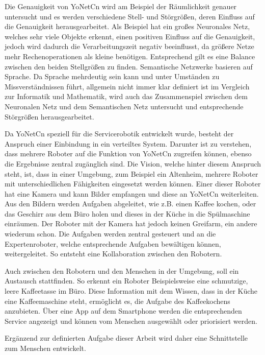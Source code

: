 Die Genauigkeit von YoNetCn wird am Beispiel der Räumlichkeit genauer untersucht und es werden verschiedene Stell- und Störgrößen, deren Einfluss auf die Genauigkeit herausgearbeitet.
Als Beispiel hat ein großes Neuronales Netz, welches sehr viele Objekte erkennt, einen positiven Einfluss auf die Genauigkeit, jedoch wird dadurch die Verarbeitungszeit negativ beeinflusst, da größere Netze mehr Rechenoperationen als kleine benötigen. Entsprechend gilt es eine Balance zwischen den beiden Stellgrößen zu finden. 
Semantische Netzwerke basieren auf Sprache. Da Sprache mehrdeutig sein kann und unter Umständen zu Missverständnissen führt, allgemein nicht immer klar definiert ist im Vergleich zur Informatik und Mathematik, wird auch das Zusammenspiel zwischen dem Neuronalen Netz und dem Semantischen Netz untersucht und entsprechende Störgrößen herausgearbeitet. 


Da YoNetCn speziell für die Servicerobotik entwickelt wurde, besteht der Anspruch einer Einbindung in ein verteiltes System. Darunter ist zu verstehen, dass mehrere Roboter auf die Funktion von YoNetCn zugreifen können, ebenso die Ergebnisse zentral zugänglich sind. Die Vision, welche hinter diesem Anspruch steht, ist, dass in einer Umgebung, zum Beispiel ein Altenheim, mehrere Roboter mit unterschiedlichen Fähigkeiten eingesetzt werden können. Einer dieser Roboter hat eine Kamera und kann Bilder empfangen und diese an YoNetCn weiterleiten. Aus den Bildern werden Aufgaben abgeleitet, wie z.B. einen Kaffee kochen, oder das Geschirr aus dem Büro holen und dieses in der Küche in die Spülmaschine einräumen. Der Roboter mit der Kamera hat jedoch keinen Greifarm, ein andere wiederum schon. Die Aufgaben werden zentral gesteuert und an die Expertenroboter, welche entsprechende Aufgaben bewältigen können, weitergeleitet. So entsteht eine Kollaboration zwischen den Robotern. 

Auch zwischen den Robotern und den Menschen in der Umgebung, soll ein Austausch stattfinden. So erkennt ein Roboter Beispielsweise eine schmutzige, leere Kaffeetasse im Büro. Diese Information mit dem Wissen, dass in der Küche eine Kaffeemaschine steht, ermöglicht es, die Aufgabe des Kaffeekochens anzubieten. Über eine App auf dem Smartphone werden die entsprechenden Service angezeigt und können vom Menschen ausgewählt oder priorisiert werden. 

Ergänzend zur definierten Aufgabe dieser Arbeit wird daher eine Schnittstelle zum Menschen entwickelt. 

